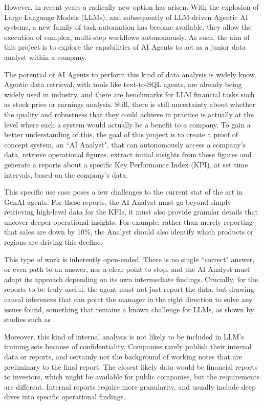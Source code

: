 \documentclass[a4paper]{report}
\begin{document}
However, in recent years a radically new option has arisen. With the explosion of Large Language Models (LLMs), and subsequently of LLM-driven Agentic AI systems, a new family of task automation has become available, they allow the execution of complex, multi-step workflows autonomously. As such, the aim of this project is to explore the capabilities of AI Agents to act as a junior data analyst within a company.

The potential of AI Agents to perform this kind of data analysis is widely know. Agentic data retrieval, with tools like text-to-SQL agents, are already being widely used in industry, and there are benchmarks for LLM financial tasks such as stock price or earnings analysis. Still, there is still uncertainty about whether the quality and robustness that they could achieve in practice is actually at the level where such a system would actually be a benefit to a company. To gain a better understanding of this, the goal of this project is to create a proof of concept system, an ``AI Analyst", that can autonomously access a company's data, retrieve operational figures, extract initial insights from these figures and generate a reports about a specific Key Performance Index (KPI), at set time intervals, based on the company's data.

This specific use case poses a few challenges to the current stat of the art in GenAI agents. For these reports, the AI Analyst must go beyond simply retrieving high-level data for the KPIs, it must also provide granular details that uncover deeper operational insights. For example, rather than merely reporting that sales are down by 10\%, the Analyst should also identify which products or regions are driving this decline.

This type of work is inherently open-ended. There is no single ``correct" answer, or even path to an answer, nor a clear point to stop, and the AI Analyst must adapt its approach depending on its own intermediate findings. Crucially, for the reports to be truly useful, the agent must not just report the data, but drawing causal inferences that can point the manager in the right direction to solve any issues found, something that remains a known challenge for LLMs, as shown by studies such as \cite{llmcausalreasoning2024}.

Moreover, this kind of internal analysis is not likely to be included in LLM's training sets because of confidentiality. Companies rarely publish their internal data or reports, and certainly not the background of working notes that are preliminary to the final report. The closest likely data would be financial reports to investors, which might be available for public companies, but the requirements are different. Internal reports require more granularity, and usually include deep dives into specific operational findings.
\end{document}
